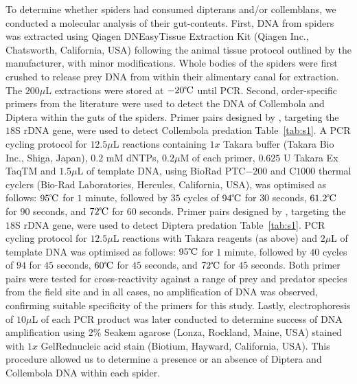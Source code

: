 \documentclass[12pt]{article}
\begin{document}
To determine whether spiders had consumed dipterans and/or collemblans, we conducted a molecular analysis of their gut-contents.  First, DNA from spiders was extracted using Qiagen DNEasy\circledR Tissue Extraction Kit (Qiagen Inc., Chatsworth, California, USA) following the animal tissue protocol outlined by the manufacturer, with minor modifications.  Whole bodies of the spiders were first crushed to release prey DNA from within their alimentary canal for extraction.  The $200 \mu$L extractions were stored at $-20\celsius$ until PCR.  Second, order-specific primers from the literature were used to detect the DNA of Collembola and Diptera within the guts of the spiders.  Primer pairs designed by \citet{Sint:2012}, targeting the $18$S rDNA gene, were used to detect Collembola predation Table~\ref{tab:s1}.  A PCR cycling protocol for $12.5 \mu$L reactions containing $1x$ Takara buffer (Takara Bio Inc., Shiga, Japan), $0.2$ mM dNTPs, $0.2 \mu$M of each primer, $0.625$ U Takara Ex TaqTM and $1.5 \mu$L of template DNA, using BioRad PTC$-200$ and C$1000$ thermal cyclers (Bio-Rad Laboratories, Hercules, California, USA), was optimised as follows: $95\celsius$ for $1$ minute, followed by $35$ cycles of $94\celsius$ for $30$ seconds, $61.2\celsius$ for $90$ seconds, and $72\celsius$ for $60$ seconds.  Primer pairs designed by \citet{Eitzinger:2014}, targeting the $18$S rDNA gene, were used to detect Diptera predation Table~\ref{tab:s1}.  PCR cycling protocol for $12.5 \mu$L reactions with Takara reagents (as above) and $2 \mu$L of template DNA was optimised as follows: $95\celsius$ for $1$ minute, followed by $40$ cycles of $94$ for $45$ seconds, $60\celsius$ for $45$ seconds, and $72\celsius$ for $45$ seconds.  Both primer pairs were tested for cross-reactivity against a range of prey and predator species from the field site and in all cases, no amplification of DNA was observed, confirming suitable specificity of the primers for this study.  Lastly, electrophoresis of $10 \mu$L of each PCR product was later conducted to determine success of DNA amplification using $2\%$ Seakem agarose (Lonza, Rockland, Maine, USA) stained with $1x$ GelRed\texttrademark nucleic acid stain (Biotium, Hayward, California, USA).  This procedure allowed us to determine a presence or an absence of Diptera and Collembola DNA within each spider. 
\end{document}
